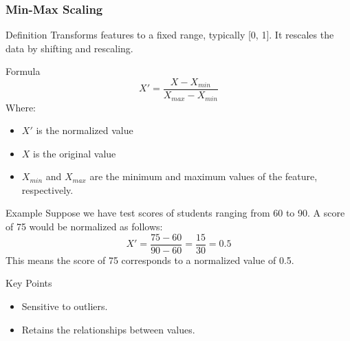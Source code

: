 \documentclass[aspectratio=169]{beamer}
\begin{document}
\begin{frame}[fragile]
    \frametitle{Min-Max Scaling}
    \begin{block}{Definition}
        Transforms features to a fixed range, typically [0, 1]. It rescales the data by shifting and rescaling.
    \end{block}
    
    \begin{block}{Formula}
        \begin{equation}
        X' = \frac{X - X_{min}}{X_{max} - X_{min}}
        \end{equation}
        Where:
        \begin{itemize}
            \item $X'$ is the normalized value
            \item $X$ is the original value
            \item $X_{min}$ and $X_{max}$ are the minimum and maximum values of the feature, respectively.
        \end{itemize}
    \end{block}
    
    \begin{block}{Example}
        Suppose we have test scores of students ranging from 60 to 90. A score of 75 would be normalized as follows:
        \begin{equation}
        X' = \frac{75 - 60}{90 - 60} = \frac{15}{30} = 0.5
        \end{equation}
        This means the score of 75 corresponds to a normalized value of 0.5.
    \end{block}
    
    \begin{block}{Key Points}
        \begin{itemize}
            \item Sensitive to outliers.
            \item Retains the relationships between values.
        \end{itemize}
    \end{block}
\end{frame}
\end{document}
